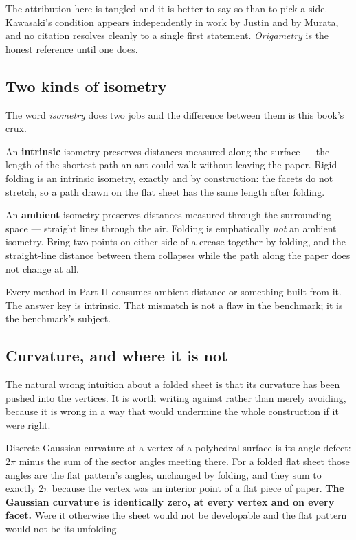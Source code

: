 \documentclass[
  british,
  a4paper,
]{book}
\begin{document}
The attribution here is tangled and it is better to say so than to pick a side.
Kawasaki's condition appears independently in work by Justin and by Murata, and
no citation resolves cleanly to a single first statement. \emph{Origametry} is the
honest reference until one does.

\subsection{Two kinds of isometry}\label{two-kinds-of-isometry}

The word \emph{isometry} does two jobs and the difference between them is this book's
crux.

An \textbf{intrinsic} isometry preserves distances measured along the surface --- the
length of the shortest path an ant could walk without leaving the paper. Rigid
folding is an intrinsic isometry, exactly and by construction: the facets do not
stretch, so a path drawn on the flat sheet has the same length after folding.

An \textbf{ambient} isometry preserves distances measured through the surrounding
space --- straight lines through the air. Folding is emphatically \emph{not} an ambient
isometry. Bring two points on either side of a crease together by folding, and
the straight-line distance between them collapses while the path along the paper
does not change at all.

Every method in Part II consumes ambient distance or something built from it.
The answer key is intrinsic. That mismatch is not a flaw in the benchmark; it is
the benchmark's subject.

\subsection{Curvature, and where it is not}\label{curvature-and-where-it-is-not}

The natural wrong intuition about a folded sheet is that its curvature has been
pushed into the vertices. It is worth writing against rather than merely
avoiding, because it is wrong in a way that would undermine the whole
construction if it were right.

Discrete Gaussian curvature at a vertex of a polyhedral surface is its angle
defect: \(2\pi\) minus the sum of the sector angles meeting there. For a folded
flat sheet those angles are the flat pattern's angles, unchanged by folding, and
they sum to exactly \(2\pi\) because the vertex was an interior point of a flat
piece of paper. \textbf{The Gaussian curvature is identically zero, at every vertex
and on every facet.} Were it otherwise the sheet would not be developable and
the flat pattern would not be its unfolding.
\end{document}
